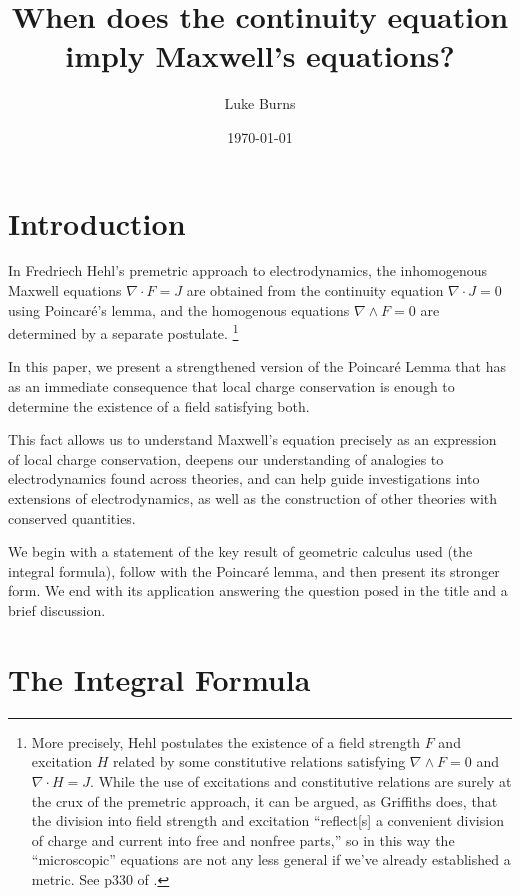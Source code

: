 \documentclass{article}
\title{When does the continuity equation imply Maxwell's equations?}
\author{Luke Burns}
\date{\small \today\vspace{-5ex}}
\begin{document}
\maketitle


\section{Introduction}

In Fredriech Hehl's premetric approach to electrodynamics, the inhomogenous Maxwell equations $\nabla \cdot F = J$ are obtained from the continuity equation $\nabla \cdot J = 0$ using Poincar\'e's lemma, and the homogenous equations $\nabla \wedge F = 0$ are determined by a separate postulate.\cite{hehl} \footnote{More precisely, Hehl postulates the existence of a field strength $F$ and excitation $H$ related by some constitutive relations satisfying $\nabla \wedge F = 0$ and $\nabla \cdot H = J$. While the use of excitations and constitutive relations are surely at the crux of the premetric approach, it can be argued, as Griffiths does, that the division into field strength and excitation ``reflect[s] a convenient division of charge and current into free and nonfree parts,'' so in this way the ``microscopic'' equations are not any less general if we've already established a metric. See p330 of \cite{griffiths}.} 

In this paper, we present a strengthened version of the Poincar\'e Lemma that has as an immediate consequence that local charge conservation is enough to determine the existence of a field satisfying both.

This fact allows us to understand Maxwell's equation precisely as an expression of local charge conservation, deepens our understanding of analogies to electrodynamics found across theories, and can help guide investigations into extensions of electrodynamics, as well as the construction of other theories with conserved quantities.

We begin with a statement of the key result of geometric calculus used (the integral formula), follow with the Poincar\'e lemma, and then present its stronger form. We end with its application answering the question posed in the title and a brief discussion.

\section{The Integral Formula}
\end{document}
